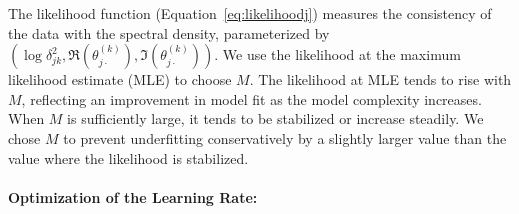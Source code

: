 \documentclass[%
 reprint,
 amsmath,amssymb,
 aps,
 nofootinbib,
]{revtex4-2}
\begin{document}
The likelihood function (Equation~\ref{eq:likelihoodj}) measures the consistency of the data with the spectral density, parameterized by $(\log \delta^2_{jk}, \Re(\theta^{(k)}_{j\cdot}), \Im(\theta^{(k)}_{j\cdot}))$. We use the likelihood at the maximum likelihood estimate (MLE) to choose $M$. The likelihood at MLE tends to rise with $M$, reflecting an improvement in model fit as the model complexity increases. When $M$ is sufficiently large, it tends to be stabilized or increase steadily. We chose $M$ to prevent underfitting conservatively by a slightly larger value than the value where the likelihood is stabilized.













\smallskip



\paragraph{Optimization of the Learning Rate:}\label{subsec:learningrate}
\end{document}
